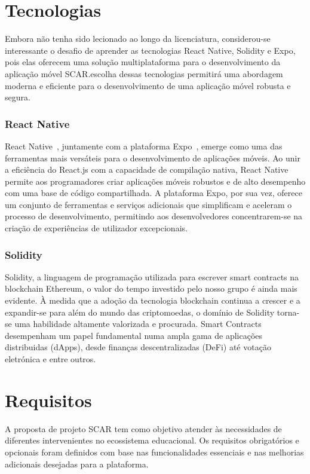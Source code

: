\documentclass[10pt]{article}
\begin{document}
\section*{Tecnologias}

Embora não tenha sido lecionado ao longo da licenciatura, considerou-se interessante o desafio de aprender
as tecnologias React Native, Solidity e Expo, pois elas oferecem uma solução multiplataforma para o
desenvolvimento da aplicação móvel SCAR.\@A escolha dessas tecnologias permitirá uma abordagem moderna e
eficiente para o desenvolvimento de uma aplicação móvel robusta e segura.

\subsubsection*{React Native}

React Native~\cite{ReactNativeBook}, juntamente com a plataforma Expo~\cite{Expo}, emerge como uma das ferramentas mais versáteis
para o desenvolvimento de aplicações móveis. Ao unir a eficiência do React.js com a capacidade de compilação
nativa, React Native permite aos programadores criar aplicações móveis robustos e de alto desempenho
com uma base de código compartilhada. A plataforma Expo, por sua vez, oferece um conjunto de ferramentas
e serviços adicionais que simplificam e aceleram o processo de desenvolvimento, permitindo aos desenvolvedores
concentrarem-se na criação de experiências de utilizador excepcionais.

\subsubsection*{Solidity}

Solidity, a linguagem de programação utilizada para escrever smart contracts na blockchain Ethereum,
o valor do tempo investido pelo nosso grupo é ainda mais evidente. À medida que a adoção da tecnologia
blockchain continua a crescer e a expandir-se para além do mundo das criptomoedas, o domínio de Solidity torna-se
uma habilidade altamente valorizada e procurada. Smart Contracts desempenham um papel fundamental numa
ampla gama de aplicações distribuidas (dApps), desde finanças descentralizadas (DeFi) até votação eletrónica
e entre outros.

\section{Requisitos}

A proposta de projeto SCAR tem como objetivo atender às necessidades de diferentes intervenientes no ecossistema educacional.
Os requisitos obrigatórios e opcionais foram definidos com base nas funcionalidades essenciais e nas melhorias adicionais
desejadas para a plataforma.
\end{document}
